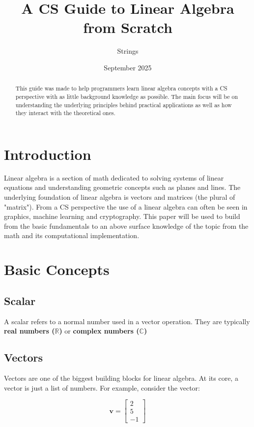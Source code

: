 \documentclass[12pt]{article}
\title{A CS Guide to Linear Algebra from Scratch}
\author{Strings}
\date{September 2025}
\begin{document}
\maketitle

\begin{abstract}
    This guide was made to help programmers learn linear algebra concepts with a CS perspective with as little background knowledge as possible. The main focus will be on understanding the underlying principles behind practical applications as well as how they interact with the theoretical ones.
\end{abstract}

\section{Introduction}
    Linear algebra is a section of math dedicated to solving systems of linear equations and understanding geometric concepts such as planes and lines. The underlying foundation of linear algebra is vectors and matrices (the plural of "matrix"). From a CS perspective the use of a linear algebra can often be seen in graphics, machine learning and cryptography.
    This paper will be used to build from the basic fundamentals to an above surface knowledge of the topic from the math and its computational implementation.

\section{Basic Concepts}
    \subsection{Scalar}
        A scalar refers to a normal number used in a vector operation.
        They are typically \textbf{real numbers ($\mathbb{R}$)} or \textbf{complex numbers ($\mathbb{C}$)} 
        
    \subsection{Vectors}
        Vectors are one of the biggest building blocks for linear algebra. 
        At its core, a vector is just a list of numbers. For example, consider the vector:

        \begin{equation}
            \mathbf{v} = \begin{bmatrix} 2 \\ 5 \\ -1 \end{bmatrix}
        \end{equation} \\
\end{document}
